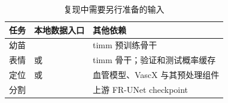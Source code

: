 \begin{table}[H]
\centering\small
\caption{复现中需要另行准备的输入}
\begin{tabularx}{\linewidth}{@{}P{23mm}YP{44mm}@{}}
\toprule
任务 & 本地数据入口 & 其他依赖 \\
\midrule
幼苗 &  & timm 预训练骨干 \\
表情 &  或  & timm 骨干；验证和测试概率缓存 \\
定位 &  或  & 血管模型、VascX 与其预处理组件 \\
分割 &  & 上游 FR-UNet checkpoint \\
\bottomrule
\end{tabularx}
\end{table}
